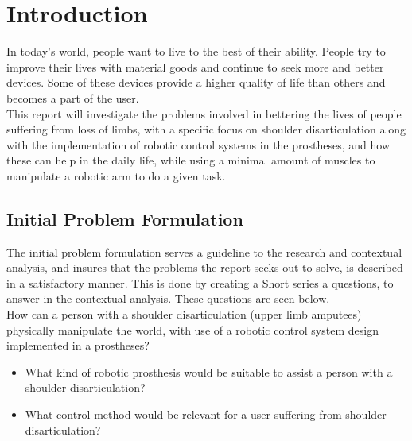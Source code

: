\chapter{Introduction}\label{ch:Introduction}

    
In today's world, people want to live to the best of their ability. People try to improve their lives with material goods and continue to seek more and better devices. Some of these devices provide a higher quality of life than others and becomes a part of the user.\\
This report will investigate the problems involved in bettering the lives of people suffering from loss of limbs, with a specific focus on shoulder disarticulation along with the implementation of robotic control systems in the prostheses, and how these can help in the daily life, while using a minimal amount of muscles to manipulate a robotic arm to do a given task.\\

\section{Initial Problem Formulation}
The initial problem formulation serves a guideline to the research and contextual analysis, and insures that the problems the report seeks out to solve, is described in a satisfactory manner. This is done by creating a Short series a questions, to answer in the contextual analysis. These questions are seen below.\\

\noindent How can a person with a shoulder disarticulation (upper limb amputees) physically manipulate the world, with use of a robotic control system design implemented in a prostheses?
\begin{itemize}
    \item What kind of robotic prosthesis would be suitable to assist a person with a shoulder disarticulation?
    \item What control method would be relevant for a user suffering from shoulder disarticulation?
\end{itemize}
